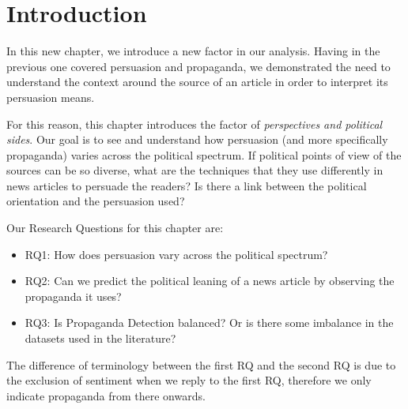 \label{chap:political_sides}

\section{\statusorange Introduction}


In this new chapter, we introduce a new factor in our analysis.
Having in the previous one covered persuasion and propaganda, we demonstrated the need to understand the context around the source of an article in order to interpret its persuasion means.

For this reason, this chapter introduces the factor of \emph{perspectives and political sides}.
Our goal is to see and understand how persuasion (and more specifically propaganda) varies across the political spectrum. If political points of view of the sources can be so diverse, what are the techniques that they use differently in news articles to persuade the readers? Is there a link between the political orientation and the persuasion used?


Our Research Questions for this chapter are:
\begin{itemize}
    \item RQ1: How does persuasion vary across the political spectrum?
    \item RQ2: Can we predict the political leaning of a news article by observing the propaganda it uses?
    \item RQ3: Is Propaganda Detection balanced? Or is there some imbalance in the datasets used in the literature?
\end{itemize}

The difference of terminology between the first RQ and the second RQ is due to the exclusion of sentiment when we reply to the first RQ, therefore we only indicate propaganda from there onwards.

